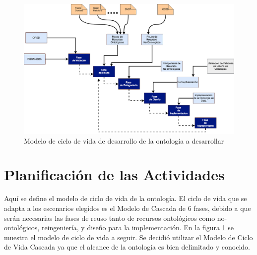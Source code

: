\begin{figure}[h!]
    \centering
    \includegraphics[width=150mm]{figuras/Diagramas-Grafico de Secuencias Desarrollo.png}
    \caption{Modelo de ciclo de vida de desarrollo de la ontología a desarrollar}
    \label{img:secuencia de desarrollo}
    \end{figure}

\section{Planificación de las Actividades}

Aquí se define el modelo de ciclo de vida de la ontología. El ciclo de vida que se adapta a los escenarios elegidos es el Modelo de Cascada de 6 fases, debido a que serán necesarias las fases de reuso tanto de recursos ontológicos como no-ontológicos, reingeniería, y diseño para la implementación. En la figura \ref{img:secuencia de desarrollo} se muestra el modelo de ciclo de vida a seguir. Se decidió utilizar el Modelo de Ciclo de Vida Cascada ya que el alcance de la ontología es bien delimitado y conocido.

